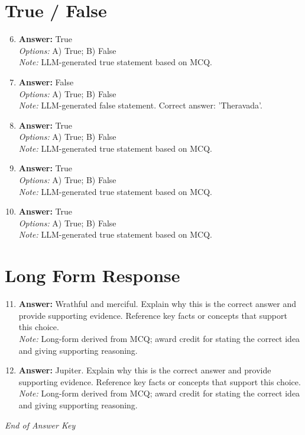 \documentclass[12pt]{article}
\begin{document}
\section*{True / False}
\begin{enumerate}[label=\arabic*.]
\setcounter{enumi}{5}
\item \textbf{Answer:} True
\\ \textit{Options:} A) True; B) False
\\ \textit{Note:} LLM-generated true statement based on MCQ.
\item \textbf{Answer:} False
\\ \textit{Options:} A) True; B) False
\\ \textit{Note:} LLM-generated false statement. Correct answer: 'Theravada'.
\item \textbf{Answer:} True
\\ \textit{Options:} A) True; B) False
\\ \textit{Note:} LLM-generated true statement based on MCQ.
\item \textbf{Answer:} True
\\ \textit{Options:} A) True; B) False
\\ \textit{Note:} LLM-generated true statement based on MCQ.
\item \textbf{Answer:} True
\\ \textit{Options:} A) True; B) False
\\ \textit{Note:} LLM-generated true statement based on MCQ.
\end{enumerate}

\section*{Long Form Response}
\begin{enumerate}[label=\arabic*.]
\setcounter{enumi}{10}
\item \textbf{Answer:} Wrathful and merciful. Explain why this is the correct answer and provide supporting evidence. Reference key facts or concepts that support this choice.
\\ \textit{Note:} Long-form derived from MCQ; award credit for stating the correct idea and giving supporting reasoning.
\item \textbf{Answer:} Jupiter. Explain why this is the correct answer and provide supporting evidence. Reference key facts or concepts that support this choice.
\\ \textit{Note:} Long-form derived from MCQ; award credit for stating the correct idea and giving supporting reasoning.
\end{enumerate}

\vfill
\noindent\textit{End of Answer Key}
\end{document}
